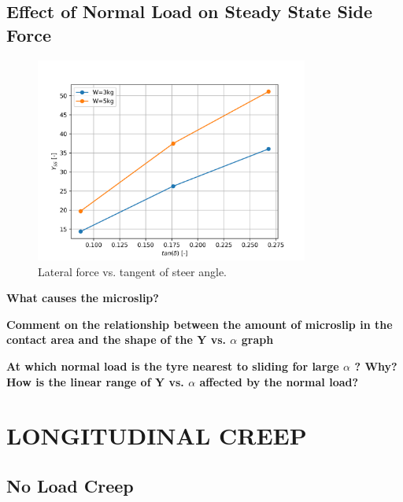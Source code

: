 \documentclass{article}
\begin{document}
\subsection{\textbf{Effect of Normal Load on Steady State Side Force}}

\begin{figure}[H]
    \centering
    \includegraphics[width=0.8\textwidth]{4.3/Yss_vs_tandelta.png}
    \caption{Lateral force vs. tangent of steer angle.}
    \label{fig:lateral_force_distance_speed}
\end{figure}

\begin{center}
    \textbf{What causes the microslip?}
\end{center}

\begin{center}
    \textbf{Comment on the relationship between the amount of microslip in the contact area and
    the shape of the Y vs. $ \alpha $ graph}
\end{center}

\begin{center}
    \textbf{At which normal load is the tyre nearest to sliding for large
    $ \alpha $ ? Why? How is the
    linear range of Y vs.
    $ \alpha $ affected by the normal load?}
\end{center}

\section{LONGITUDINAL CREEP}

\subsection{\textbf{No Load Creep}}
\end{document}
